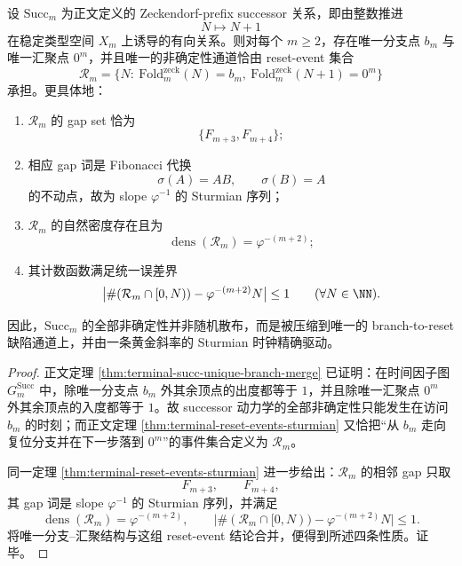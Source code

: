 \begin{theorem}\label{thm:conclusion-zeckendorf-successor-graph-sturmian-defect-clock}
设 \(\mathrm{Succ}_m\) 为正文定义的 Zeckendorf-prefix successor 关系，即由整数推进
\[
N\longmapsto N+1
\]
在稳定类型空间 \(X_m\) 上诱导的有向关系。则对每个 \(m\ge 2\)，存在唯一分支点 \(b_m\) 与唯一汇聚点 \(0^m\)，并且唯一的非确定性通道恰由 reset-event 集合
\[
\mathcal R_m
=
\{N:\ \mathrm{Fold}^{\mathrm{zeck}}_m(N)=b_m,\ \mathrm{Fold}^{\mathrm{zeck}}_m(N+1)=0^m\}
\]
承担。更具体地：
\begin{enumerate}
  \item \(\mathcal R_m\) 的 gap set 恰为
  \[
  \{F_{m+3},F_{m+4}\};
  \]
  \item 相应 gap 词是 Fibonacci 代换
  \[
  \sigma(A)=AB,
  \qquad
  \sigma(B)=A
  \]
  的不动点，故为 slope \(\varphi^{-1}\) 的 Sturmian 序列；
  \item \(\mathcal R_m\) 的自然密度存在且为
  \[
  \operatorname{dens}(\mathcal R_m)=\varphi^{-(m+2)};
  \]
  \item 其计数函数满足统一误差界
  \[
  \bigl|\#(\mathcal R_m\cap[0,N))-\varphi^{-(m+2)}N\bigr|\le 1
  \qquad(\forall N\in\NN).
  \]
\end{enumerate}
因此，\(\mathrm{Succ}_m\) 的全部非确定性并非随机散布，而是被压缩到唯一的 branch-to-reset 缺陷通道上，并由一条黄金斜率的 Sturmian 时钟精确驱动。
\end{theorem}
\begin{proof}
正文定理 \ref{thm:terminal-succ-unique-branch-merge} 已证明：在时间因子图 \(G_m^{\mathrm{Succ}}\) 中，除唯一分支点 \(b_m\) 外其余顶点的出度都等于 \(1\)，并且除唯一汇聚点 \(0^m\) 外其余顶点的入度都等于 \(1\)。故 successor 动力学的全部非确定性只能发生在访问 \(b_m\) 的时刻；而正文定理 \ref{thm:terminal-reset-events-sturmian} 又恰把“从 \(b_m\) 走向复位分支并在下一步落到 \(0^m\)”的事件集合定义为 \(\mathcal R_m\)。

同一定理 \ref{thm:terminal-reset-events-sturmian} 进一步给出：\(\mathcal R_m\) 的相邻 gap 只取
\[
F_{m+3},\qquad F_{m+4},
\]
其 gap 词是 slope \(\varphi^{-1}\) 的 Sturmian 序列，并满足
\[
\operatorname{dens}(\mathcal R_m)=\varphi^{-(m+2)},
\qquad
\bigl|\#(\mathcal R_m\cap[0,N))-\varphi^{-(m+2)}N\bigr|\le 1.
\]
将唯一分支--汇聚结构与这组 reset-event 结论合并，便得到所述四条性质。证毕。
\end{proof}

